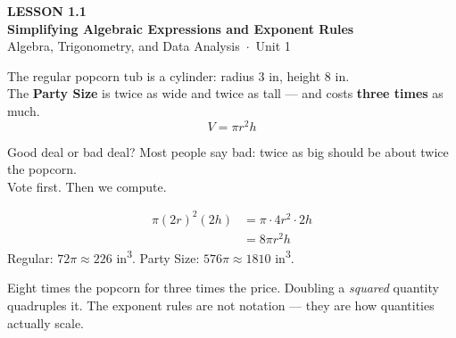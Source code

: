 \documentclass[aspectratio=169, 11pt]{beamer}
\begin{document}
{
\begin{frame}[plain]
  \vspace{2.8cm}\hspace{0.55cm}%
  \begin{minipage}{0.9\textwidth}
    {\color{goldacc}\bfseries\small LESSON 1.1}\\[0.5cm]
    {\color{white}\bfseries\LARGE Simplifying Algebraic Expressions and Exponent Rules}\\[1.2cm]
    {\color{mistmid}\small Algebra, Trigonometry, and Data Analysis~$\cdot$~Unit 1}
  \end{minipage}
\end{frame}
}

\begin{frame}[t, plain]
  The regular popcorn tub is a cylinder: radius $3$ in, height $8$ in.\\
  The \textbf{Party Size} is twice as wide and twice as tall --- and costs \textbf{three times}
  as much.
  \[ V = \pi r^2 h \]
  \begin{block}{Good deal or bad deal?}
    Most people say bad: twice as big should be about twice the popcorn.\\[2pt]
    Vote first. Then we compute.
  \end{block}
\end{frame}

\begin{frame}[t, plain]
  \[
  \begin{aligned}
    \pi(2r)^2(2h) &= \pi \cdot 4r^2 \cdot 2h \\
                  &= 8\pi r^2 h
  \end{aligned}
  \]
  Regular: $72\pi \approx 226$ in\textsuperscript{3}. \qquad
  Party Size: $576\pi \approx 1810$ in\textsuperscript{3}.
  \begin{block}{Eight times the popcorn for three times the price.}
    Doubling a \emph{squared} quantity quadruples it. The exponent rules are not notation ---
    they are how quantities actually scale.
  \end{block}
\end{frame}
\end{document}
